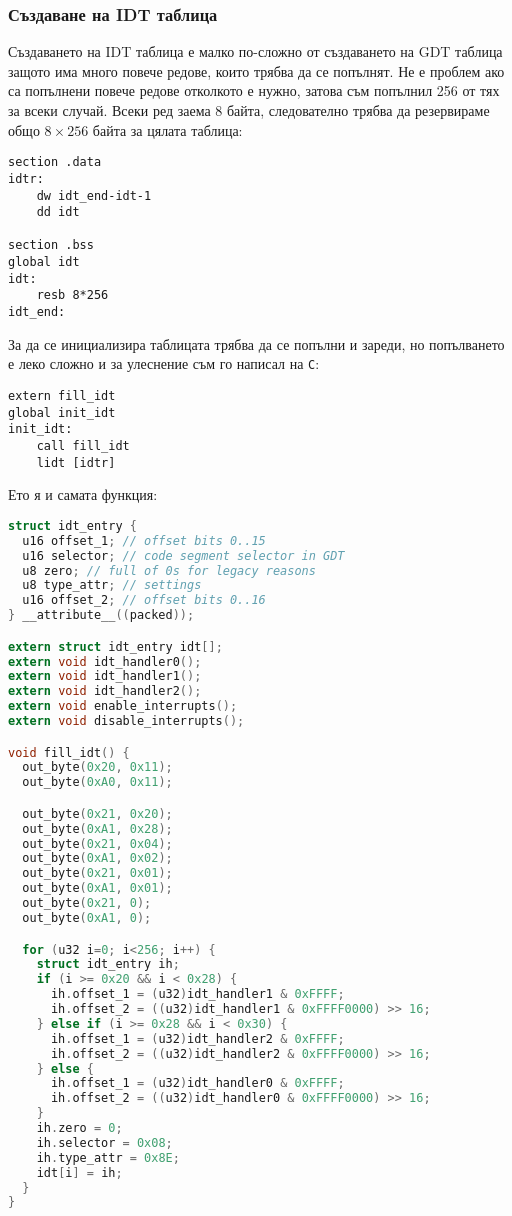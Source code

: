 \subsubsection{Създаване на IDT таблица}
Създаването на IDT таблица е малко по-сложно от създаването на GDT таблица защото има много повече редове, които трябва да се попълнят. Не е проблем ако са попълнени повече редове отколкото е нужно, затова съм попълнил 256 от тях за всеки случай. Всеки ред заема 8 байта, следователно трябва да резервираме общо $8\times 256$ байта за цялата таблица:
\begin{lstlisting}
section .data
idtr:
    dw idt_end-idt-1
    dd idt

section .bss
global idt
idt:
    resb 8*256
idt_end:
\end{lstlisting}
За да се инициализира таблицата трябва да се попълни и зареди, но попълването е леко сложно и за улеснение съм го написал на {\tt C}:
\begin{lstlisting}
extern fill_idt
global init_idt
init_idt:
    call fill_idt
    lidt [idtr]
\end{lstlisting}
Ето я и самата функция:
\begin{lstlisting}[language=C]
struct idt_entry {
  u16 offset_1; // offset bits 0..15
  u16 selector; // code segment selector in GDT
  u8 zero; // full of 0s for legacy reasons
  u8 type_attr; // settings
  u16 offset_2; // offset bits 0..16
} __attribute__((packed));

extern struct idt_entry idt[];
extern void idt_handler0();
extern void idt_handler1();
extern void idt_handler2();
extern void enable_interrupts();
extern void disable_interrupts();

void fill_idt() {
  out_byte(0x20, 0x11);
  out_byte(0xA0, 0x11);

  out_byte(0x21, 0x20);
  out_byte(0xA1, 0x28);
  out_byte(0x21, 0x04);
  out_byte(0xA1, 0x02);
  out_byte(0x21, 0x01);
  out_byte(0xA1, 0x01);
  out_byte(0x21, 0);
  out_byte(0xA1, 0);

  for (u32 i=0; i<256; i++) {
    struct idt_entry ih;
    if (i >= 0x20 && i < 0x28) {
      ih.offset_1 = (u32)idt_handler1 & 0xFFFF;
      ih.offset_2 = ((u32)idt_handler1 & 0xFFFF0000) >> 16;
    } else if (i >= 0x28 && i < 0x30) {
      ih.offset_1 = (u32)idt_handler2 & 0xFFFF;
      ih.offset_2 = ((u32)idt_handler2 & 0xFFFF0000) >> 16;
    } else {
      ih.offset_1 = (u32)idt_handler0 & 0xFFFF;
      ih.offset_2 = ((u32)idt_handler0 & 0xFFFF0000) >> 16;
    }
    ih.zero = 0;
    ih.selector = 0x08;
    ih.type_attr = 0x8E;
    idt[i] = ih;
  }
}
\end{lstlisting}
